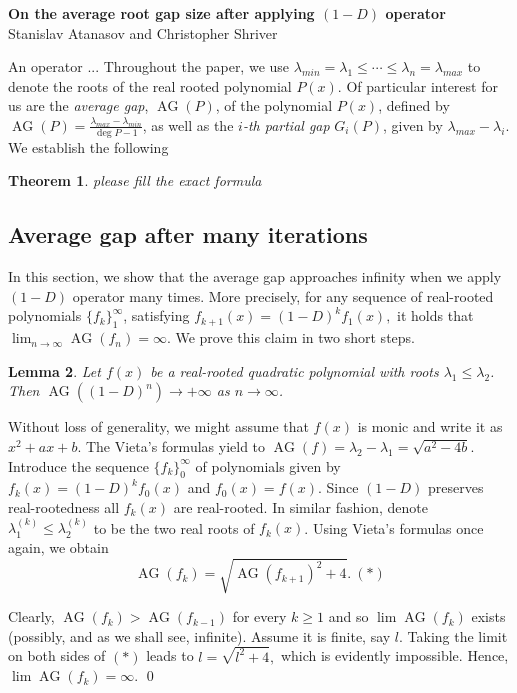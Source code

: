 \documentclass[11pt]{article}
\DeclareMathOperator{\AG}{AG}
\newtheorem{theorem}{Theorem}[section]
\newtheorem{lemma}[theorem]{Lemma}
\begin{document}
\begin{center}
\textbf{On the average root gap size after applying $(1-D)$ operator}\\
Stanislav Atanasov and Christopher Shriver
\end{center}

An operator ...
Throughout the paper, we use $\lambda_{min}=\lambda_1\leq \cdots \leq \lambda_n = \lambda_{max}$ to denote the roots of the real rooted polynomial $P(x)$. Of particular interest for us are the \emph{average gap}, $\AG(P)$, of the polynomial $P(x)$, defined by $\AG(P)=\frac{\lambda_{max} - \lambda_{min}}{\deg P - 1}$, as well as the \emph{$i$-th partial gap} $G_i(P)$, given by $\lambda_{max}-\lambda_i$. We establish the following

\begin{theorem}
please fill the exact formula
\end{theorem}

\subsection{Average gap after many iterations}
 In this section, we show that the average gap approaches infinity when we apply $(1-D)$ operator many times. More precisely, for any sequence of real-rooted polynomials $\{f_k\}_1^{\infty}$, satisfying $f_{k+1}(x) = (1-D)^k f_{1}(x),$ it holds that $\lim_{n\to \infty} \AG(f_n) = \infty$. We prove this claim in two short steps.

 \begin{lemma}
 \label{degree two avg distance}
 Let $f(x)$ be a real-rooted quadratic polynomial with roots $\lambda_1 \leq \lambda_2$. Then $\AG((1-D)^n) \to +\infty$ as ${n\to \infty}$.
 \end{lemma}
\proof
Without loss of generality, we might assume that $f(x)$ is monic and write it as $x^2+ax+b$. The Vieta's formulas yield to $\AG(f) = \lambda_2 - \lambda_1 = \sqrt{a^2 - 4b}$. Introduce the sequence $\{f_k\}_{0}^\infty$ of polynomials given by $f_{k} (x)= (1-D)^k f_0(x)$ and $f_0(x) = f(x)$. Since $(1-D)$ preserves real-rootedness all $f_k(x)$ are real-rooted. In similar fashion, denote $\lambda_1^{(k)} \leq \lambda_2^{(k)}$ to be the two real roots of $f_k(x)$. Using Vieta's formulas once again, we obtain
 \[\AG(f_k) = \sqrt{\AG(f_{k+1})^2 + 4}.~(*)\]

 Clearly, $\AG(f_k) > \AG(f_{k-1})$ for every $k\ge 1$ and so  $\lim \AG(f_k)$ exists (possibly, and as we shall see, infinite). Assume it is finite, say $l$. Taking the limit on both sides of $(*)$ leads to $l = \sqrt{l^2 + 4},$ which is evidently impossible. Hence, $\lim \AG(f_k) = \infty$. \qed
\end{document}

